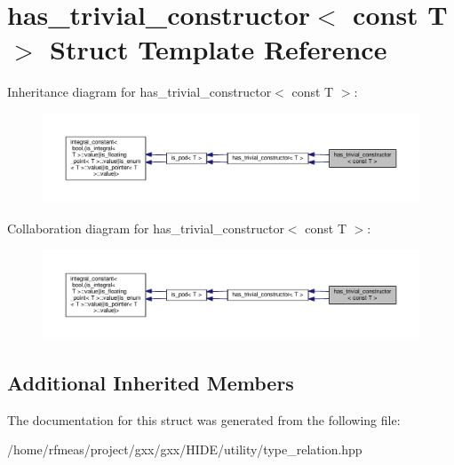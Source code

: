 \hypertarget{structhas__trivial__constructor_3_01const_01T_01_4}{}\section{has\+\_\+trivial\+\_\+constructor$<$ const T $>$ Struct Template Reference}
\label{structhas__trivial__constructor_3_01const_01T_01_4}


Inheritance diagram for has\+\_\+trivial\+\_\+constructor$<$ const T $>$\+:
\nopagebreak
\begin{figure}[H]
\begin{center}
\leavevmode
\includegraphics[width=350pt]{structhas__trivial__constructor_3_01const_01T_01_4__inherit__graph}
\end{center}
\end{figure}


Collaboration diagram for has\+\_\+trivial\+\_\+constructor$<$ const T $>$\+:
\nopagebreak
\begin{figure}[H]
\begin{center}
\leavevmode
\includegraphics[width=350pt]{structhas__trivial__constructor_3_01const_01T_01_4__coll__graph}
\end{center}
\end{figure}
\subsection*{Additional Inherited Members}


The documentation for this struct was generated from the following file\+:\begin{DoxyCompactItemize}
\item 
/home/rfmeas/project/gxx/gxx/\+H\+I\+D\+E/utility/type\+\_\+relation.\+hpp\end{DoxyCompactItemize}
